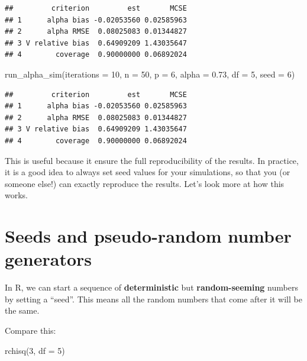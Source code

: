 \documentclass[
]{book}
\newenvironment{Shaded}{\begin{snugshade}}{\end{snugshade}}
\newcommand{\AttributeTok}[1]{\textcolor[rgb]{0.77,0.63,0.00}{#1}}
\newcommand{\DecValTok}[1]{\textcolor[rgb]{0.00,0.00,0.81}{#1}}
\newcommand{\FloatTok}[1]{\textcolor[rgb]{0.00,0.00,0.81}{#1}}
\newcommand{\FunctionTok}[1]{\textcolor[rgb]{0.00,0.00,0.00}{#1}}
\newcommand{\NormalTok}[1]{#1}
\begin{document}
\begin{verbatim}
##         criterion         est       MCSE
## 1      alpha bias -0.02053560 0.02585963
## 2      alpha RMSE  0.08025083 0.01344827
## 3 V relative bias  0.64909209 1.43035647
## 4        coverage  0.90000000 0.06892024
\end{verbatim}

\begin{Shaded}
\begin{Highlighting}[]
\FunctionTok{run\_alpha\_sim}\NormalTok{(}\AttributeTok{iterations =} \DecValTok{10}\NormalTok{, }\AttributeTok{n =} \DecValTok{50}\NormalTok{, }\AttributeTok{p =} \DecValTok{6}\NormalTok{, }\AttributeTok{alpha =} \FloatTok{0.73}\NormalTok{, }\AttributeTok{df =} \DecValTok{5}\NormalTok{, }\AttributeTok{seed =} \DecValTok{6}\NormalTok{)}
\end{Highlighting}
\end{Shaded}

\begin{verbatim}
##         criterion         est       MCSE
## 1      alpha bias -0.02053560 0.02585963
## 2      alpha RMSE  0.08025083 0.01344827
## 3 V relative bias  0.64909209 1.43035647
## 4        coverage  0.90000000 0.06892024
\end{verbatim}

This is useful because it ensure the full reproducibility of the results. In practice, it is a good idea to always set seed values for your simulations, so that you (or someone else!) can exactly reproduce the results.
Let's look more at how this works.

\hypertarget{seeds-and-pseudo-random-number-generators}{%
\section{Seeds and pseudo-random number generators}\label{seeds-and-pseudo-random-number-generators}}

In R, we can start a sequence of \textbf{deterministic} but \textbf{random-seeming} numbers by setting a ``seed''.
This means all the random numbers that come after it will be the same.

Compare this:

\begin{Shaded}
\begin{Highlighting}[]
\FunctionTok{rchisq}\NormalTok{(}\DecValTok{3}\NormalTok{, }\AttributeTok{df =} \DecValTok{5}\NormalTok{)}
\end{Highlighting}
\end{Shaded}
\end{document}
